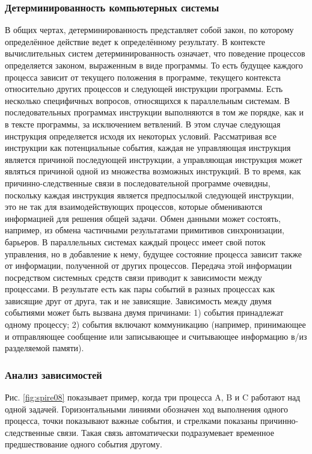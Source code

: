 \subsubsection{Детерминированность компьютерных системы}
В общих чертах, детерминированность представляет собой закон, по которому определённое действие ведет к определённому результату. В контексте вычислительных систем детерминированность означает, что поведение процессов определяется законом, выраженным в виде программы. То есть будущее каждого процесса зависит от текущего положения в программе, текущего контекста относительно других процессов и следующей инструкции программы. Есть несколько специфичных вопросов, относящихся к параллельным системам. В последовательных программах инструкции выполняются в том же порядке, как и в тексте программы, за исключением ветвлений. В этом случае следующая инструкция определяется исходя их некоторых условий. Рассматривая все инструкции как потенциальные события, каждая не управляющая инструкция является причиной последующей инструкции, а управляющая инструкция может являться причиной одной из множества возможных инструкций. В то время, как причинно-следственные связи в последовательной программе очевидны, поскольку каждая инструкция является предпосылкой следующей инструкции, это не так для взаимодействующих процессов, которые обмениваются информацией для решения общей задачи. Обмен данными может состоять, например, из обмена частичными результатами примитивов синхронизации, барьеров. В параллельных системах каждый процесс имеет свой поток управления, но в добавление к нему, будущее состояние процесса зависит также от информации, полученной от других процессов. Передача этой информации посредством системных средств связи приводит к зависимости между процессами. В результате есть как пары событий в разных процессах как зависящие друг от друга, так и не зависящие.
Зависимость между двумя событиями может быть вызвана двумя причинами: 1) события принадлежат одному процессу; 2) события включают коммуникацию (например, принимающее и отправляющее сообщение или записывающее и считывающее информацию в/из разделяемой памяти).
\subsubsection{Анализ зависимостей}
 Рис. \ref{fig:spire08} показывает пример, когда три процесса A, B и C работают над одной задачей. Горизонтальными линиями обозначен ход выполнения одного процесса, точки показывают важные события, и стрелками показаны причинно-следственные связи. Такая связь автоматически подразумевает временное предшествование одного события другому. 

